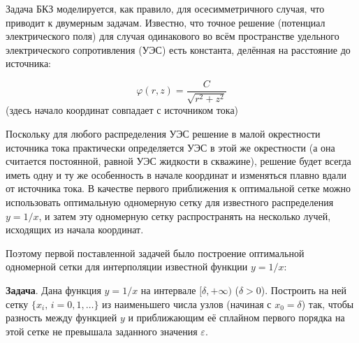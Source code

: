 Задача БКЗ моделируется, как правило, для осесимметричного случая, что приводит к двумерным задачам.
Известно, что точное решение (потенциал электрического поля) для случая одинакового во всём пространстве
удельного электрического сопротивления (УЭС) есть константа, делённая на расстояние до источника:

$$\varphi(r, z)=\frac{C}{\sqrt{r^2+z^2}}$$ (здесь начало координат совпадает с источником тока)

Поскольку для любого распределения УЭС решение в малой окрестности источника тока практически определяется
УЭС в этой же окрестности (а она считается постоянной, равной УЭС жидкости в скважине), решение будет всегда
иметь одну и ту же особенность в начале координат и изменяться плавно вдали от источника тока.
В качестве первого приближения к оптимальной сетке можно использовать оптимальную одномерную сетку
для известного распределения ${y=1/x}$, и затем эту одномерную сетку распространять на несколько лучей,
исходящих из начала координат.

Поэтому первой поставленной задачей было построение оптимальной одномерной сетки для интерполяции
известной функции ${y=1/x}$:

{\bf Задача}. Дана функция ${y=1/x}$ на интервале ${[\delta, +\infty)}$ (${\delta > 0}$). Построить на ней сетку
${\{x_i,\,i=0,1,\dots\}}$ из наименьшего числа узлов (начиная с ${x_0=\delta}$) так, чтобы разность между
функцией ${y}$ и приближающим её сплайном первого порядка на этой сетке не превышала заданного значения
${\varepsilon}$.

\def\ibreak{& \\ &}
\def\iline{& \\ \cline{1-2} &}

\makeatletter
\newenvironment{customenv}
  {\align &} %
  {& \endalign}

\newenvironment{systemed}
  {\left\{ \begin{aligned} &}
  {& \end{aligned} \right.}

\newenvironment{totalited}
  {\left[ \begin{aligned} &}
  {& \end{aligned} \right.}


